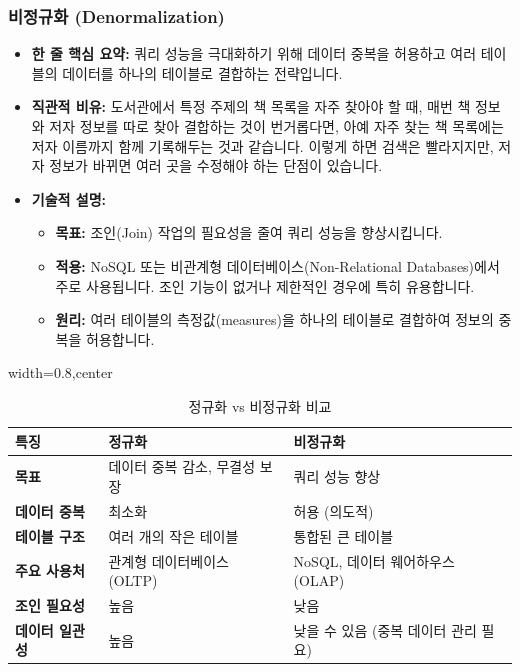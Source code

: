 \documentclass[11pt,a4paper]{article}
\begin{document}
\subsubsection{비정규화 (Denormalization)}
\begin{itemize}
    \item \textbf{한 줄 핵심 요약:} 쿼리 성능을 극대화하기 위해 데이터 중복을 허용하고 여러 테이블의 데이터를 하나의 테이블로 결합하는 전략입니다.
    \item \textbf{직관적 비유:} 도서관에서 특정 주제의 책 목록을 자주 찾아야 할 때, 매번 책 정보와 저자 정보를 따로 찾아 결합하는 것이 번거롭다면, 아예 자주 찾는 책 목록에는 저자 이름까지 함께 기록해두는 것과 같습니다. 이렇게 하면 검색은 빨라지지만, 저자 정보가 바뀌면 여러 곳을 수정해야 하는 단점이 있습니다.
    \item \textbf{기술적 설명:}
    \begin{itemize}
        \item \textbf{목표:} 조인(Join) 작업의 필요성을 줄여 쿼리 성능을 향상시킵니다.
        \item \textbf{적용:} NoSQL 또는 비관계형 데이터베이스(Non-Relational Databases)에서 주로 사용됩니다. 조인 기능이 없거나 제한적인 경우에 특히 유용합니다.
        \item \textbf{원리:} 여러 테이블의 측정값(measures)을 하나의 테이블로 결합하여 정보의 중복을 허용합니다.
    \end{itemize}
\end{itemize}

\begin{table}[htbp]
\centering
\caption{정규화 vs 비정규화 비교}
\label{tab:normalization_vs_denormalization}
\begin{adjustbox}{width=0.8\textwidth,center}
\begin{tabular}{lll}
\toprule
\textbf{특징} & \textbf{정규화} & \textbf{비정규화} \\
\midrule
\textbf{목표} & 데이터 중복 감소, 무결성 보장 & 쿼리 성능 향상 \\
\textbf{데이터 중복} & 최소화 & 허용 (의도적) \\
\textbf{테이블 구조} & 여러 개의 작은 테이블 & 통합된 큰 테이블 \\
\textbf{주요 사용처} & 관계형 데이터베이스 (OLTP) & NoSQL, 데이터 웨어하우스 (OLAP) \\
\textbf{조인 필요성} & 높음 & 낮음 \\
\textbf{데이터 일관성} & 높음 & 낮을 수 있음 (중복 데이터 관리 필요) \\
\bottomrule
\end{tabular}
\end{adjustbox}
\end{table}
\end{document}
